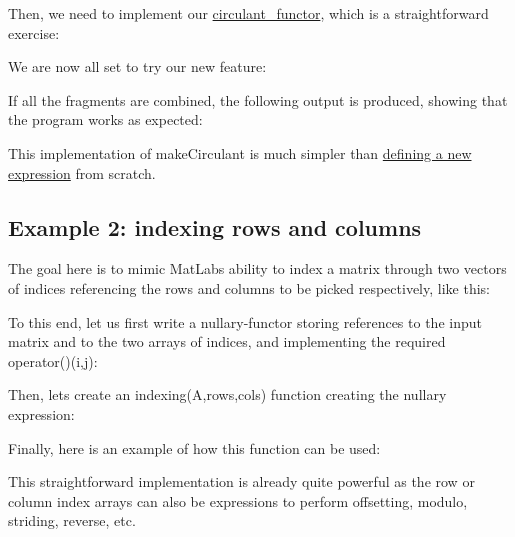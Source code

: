 Then, we need to implement our {\ttfamily \hyperlink{classcirculant__functor}{circulant\+\_\+functor}}, which is a straightforward exercise\+:


\begin{DoxyCodeInclude}
\end{DoxyCodeInclude}
 We are now all set to try our new feature\+:


\begin{DoxyCodeInclude}
\end{DoxyCodeInclude}


If all the fragments are combined, the following output is produced, showing that the program works as expected\+:


\begin{DoxyCodeInclude}
\end{DoxyCodeInclude}


This implementation of {\ttfamily make\+Circulant} is much simpler than \hyperlink{TopicNewExpressionType}{defining a new expression} from scratch.\hypertarget{_topic_customizing__nullary_expr_NullaryExpr_Indexing}{}\subsection{Example 2\+: indexing rows and columns}\label{_topic_customizing__nullary_expr_NullaryExpr_Indexing}
The goal here is to mimic Mat\+Lab\textquotesingle{}s ability to index a matrix through two vectors of indices referencing the rows and columns to be picked respectively, like this\+:


\begin{DoxyCodeInclude}
\end{DoxyCodeInclude}
 To this end, let us first write a nullary-\/functor storing references to the input matrix and to the two arrays of indices, and implementing the required {\ttfamily operator()(i,j)}\+:


\begin{DoxyCodeInclude}
\end{DoxyCodeInclude}
 Then, let\textquotesingle{}s create an {\ttfamily indexing(\+A,rows,cols)} function creating the nullary expression\+:


\begin{DoxyCodeInclude}
\end{DoxyCodeInclude}
 Finally, here is an example of how this function can be used\+:


\begin{DoxyCodeInclude}
\end{DoxyCodeInclude}
 This straightforward implementation is already quite powerful as the row or column index arrays can also be expressions to perform offsetting, modulo, striding, reverse, etc.


